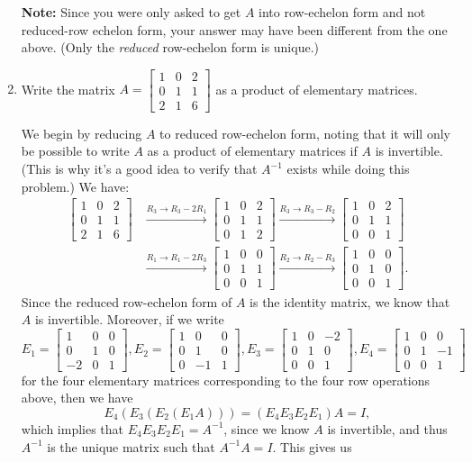 \documentclass[12pt]{article}
\newcommand{\bbm}{\begin{bmatrix}}
\newcommand{\ebm}{\end{bmatrix}}
\begin{document}
\begin{enumerate}
\medskip

\textbf{Note:} Since you were only asked to get $A$ into row-echelon form and not reduced-row echelon form, your answer may have been different from the one above. (Only the \textit{reduced} row-echelon form is unique.)




\item Write the matrix $A = \bbm 1&0&2\\0&1&1\\2&1&6\ebm$ as a product of elementary matrices.

\medskip

We begin by reducing $A$ to reduced row-echelon form, noting that it will only be possible to write $A$ as a product of elementary matrices if $A$ is invertible. (This is why it's a good idea to verify that $A^{-1}$ exists while doing this problem.) We have:
\begin{align*}
 \bbm 1&0&2\\0&1&1\\2&1&6\ebm &\xrightarrow{R_3\to R_3-2R_1} \bbm 1&0&2\\0&1&1\\0&1&2\ebm \xrightarrow{R_3\to R_3-R_2} \bbm 1&0&2\\0&1&1\\0&0&1\ebm\\
&\xrightarrow{R_1\to R_1-2R_3}\bbm 1&0&0\\0&1&1\\0&0&1\ebm \xrightarrow{R_2\to R_2-R_3} \bbm 1&0&0\\0&1&0\\0&0&1\ebm. 
\end{align*}
Since the reduced row-echelon form of $A$ is the identity matrix, we know that $A$ is invertible. Moreover, if we write
\[
 E_1 = \bbm 1&0&0\\0&1&0\\-2&0&1\ebm, E_2 = \bbm 1&0&0\\0&1&0\\0&-1&1\ebm, E_3 = \bbm 1&0&-2\\0&1&0\\0&0&1\ebm, E_4 = \bbm 1&0&0\\0&1&-1\\0&0&1\ebm
\]
for the four elementary matrices corresponding to the four row operations above, then we have
\[
 E_4(E_3(E_2(E_1A))) = (E_4E_3E_2E_1)A = I,
\]
which implies that $E_4E_3E_2E_1 = A^{-1}$, since we know $A$ is invertible, and thus $A^{-1}$ is the unique matrix such that $A^{-1}A=I$. This gives us

\end{enumerate}
\end{document}
